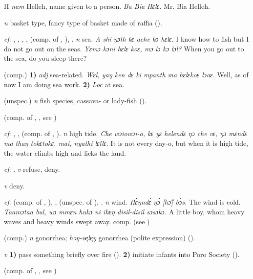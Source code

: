 \begin{letter}{H}
 \textit{nam} Helleh, name given to a person. \textit{Ba Bia Hɛlɛ.} Mr. Bia Helleh.

 \textit{n} basket type, fancy type of basket made of raffia (\citealt{Pichl1967}). 

 \textit{cf}: , , , ,  (comp. of , ), . \textit{n} sea. \textit{A shi ŋɔth kɛ ache kɔ hɛlɛ.} I know how to fish but I do not go out on the seas. \textit{Yɛmɔ kɔni hɛlɛ koɛ, mɔ lɔ kɔ lɔl?} When you go out to the sea, do you sleep there?

 (comp.) \textbf{1)} \textit{adj} sea-related. \textit{Wɛl, yaŋ ken dɛ ki mpanth ma hɛlɛkoɛ lɔaɛ.} Well, as of now I am doing sea work. \textbf{2)} \textit{Loc} at sea.

 (unspec.) \textit{n} fish species, cassava- or lady-fish (\citealt{Pichl1967}).

 (comp. of , , see ) 

 \textit{cf}: , ,  (comp. of , ). \textit{n} high tide. \textit{Che wɔiowɔi-o, kɛ yɛ helendɛ ŋɔ che vɛ, ŋɔ mɛndɛ ma thaŋ tokɛtokɛ, mai, nyathi lɛllɛ.} It is not every day-o, but when it is high tide, the water climbs high and licks the land.

 \textit{cf}: . \textit{v} refuse, deny.

 \textit{v} deny.

 \textit{cf}:  (comp. of , ), ,  (unspec. of ), . \textit{n} wind. \textit{Hɛ̀ŋndɛ́ ŋɔ́ [hɔ̃] bɔ̀s.} The wind is cold. \textit{Taamɔtaa bul, wɔ mmɛn hukɔ ni ihɛŋ disil-disil sɔsɔkɔ.} A little boy, whom heavy waves and heavy winds swept away. comp.  (see ) 

 (comp.) \textit{n} gonorrhea; \textit{həŋ-ve̹le̹ŋ} gonorrhea (polite expression) (\citealt{Pichl1967}). 

 \textit{v} \textbf{1)} pass something briefly over fire (\citealt{Pichl1967}). \textbf{2)} initiate infants into Poro Society (\citealt{Pichl1967}). 

 (comp. of , , see ) 


\end{letter}
